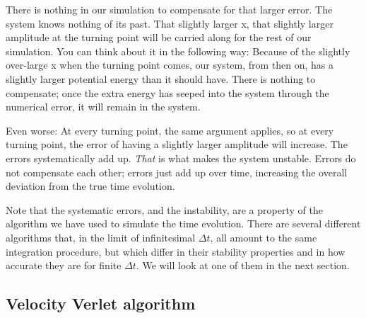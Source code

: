 \documentclass[twocolumn,apj]{openjournal}
\begin{document}
There is nothing in our simulation to compensate for that larger error. The system knows nothing of its past. That slightly larger x, that slightly larger amplitude at the turning point will be carried along for the rest of our simulation. You can think about it in the following way: Because of the slightly over-large x when the turning point comes, our system, from then on, has a slightly larger potential energy than it should have. There is nothing to compensate; once the extra energy has seeped into the system through the numerical error, it will remain in the system.

Even worse: At every turning point, the same argument applies, so at every turning point, the error of having a slightly larger amplitude will increase. The errors systematically add up. {\em That} is what makes the system unstable. Errors do not compensate each other; errors just add up over time, increasing the overall deviation from the true time evolution.

Note that the systematic errors, and the instability, are a property of the algorithm we have used to simulate the time evolution. There are several different algorithms that, in the limit of infinitesimal $\Delta t$, all amount to the same integration procedure, but which differ in their stability properties and in how accurate they are for finite $\Delta t$. We will look at one of them in the next section.

\subsection{Velocity Verlet algorithm}
\end{document}
